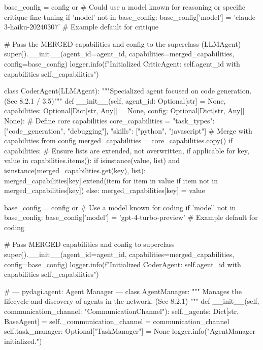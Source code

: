 \documentclass{amsbook}
\theoremstyle{definition}
\theoremstyle{remark}
\numberwithin{equation}{chapter} %
\begin{document}
\begin{python}
        base_config = config or {}
        # Could use a model known for reasoning or specific critique fine-tuning
        if 'model' not in base_config:
             base_config['model'] = 'claude-3-haiku-20240307' # Example default for critique

        # Pass the MERGED capabilities and config to the superclass (LLMAgent)
        super().__init__(agent_id=agent_id, capabilities=merged_capabilities, config=base_config)
        logger.info(f"Initialized CriticAgent: {self.agent_id} with capabilities {self._capabilities}")


class CoderAgent(LLMAgent):
    """Specialized agent focused on code generation. (Sec 8.2.1 / 3.5)"""
    def __init__(self, agent_id: Optional[str] = None, capabilities: Optional[Dict[str, Any]] = None, config: Optional[Dict[str, Any]] = None):
        # Define core capabilities
        core_capabilities = {"task_types": ["code_generation", "debugging"], "skills": ["python", "javascript"]}
        # Merge with capabilities from config
        merged_capabilities = core_capabilities.copy()
        if capabilities:
             # Ensure lists are extended, not overwritten, if applicable
            for key, value in capabilities.items():
                 if isinstance(value, list) and isinstance(merged_capabilities.get(key), list):
                      merged_capabilities[key].extend(item for item in value if item not in merged_capabilities[key])
                 else:
                      merged_capabilities[key] = value

        base_config = config or {}
        # Use a model known for coding
        if 'model' not in base_config:
             base_config['model'] = 'gpt-4-turbo-preview' # Example default for coding

        # Pass MERGED capabilities and config to superclass
        super().__init__(agent_id=agent_id, capabilities=merged_capabilities, config=base_config)
        logger.info(f"Initialized CoderAgent: {self.agent_id} with capabilities {self._capabilities}")


# --- pydagi.agent: Agent Manager ---
class AgentManager:
    """
    Manages the lifecycle and discovery of agents in the network. (Sec 8.2.1)
    """
    def __init__(self, communication_channel: "CommunicationChannel"):
        self._agents: Dict[str, BaseAgent] = {}
        self._communication_channel = communication_channel
        self.task_manager: Optional["TaskManager"] = None
        logger.info("AgentManager initialized.")


\end{python}
\end{document}
